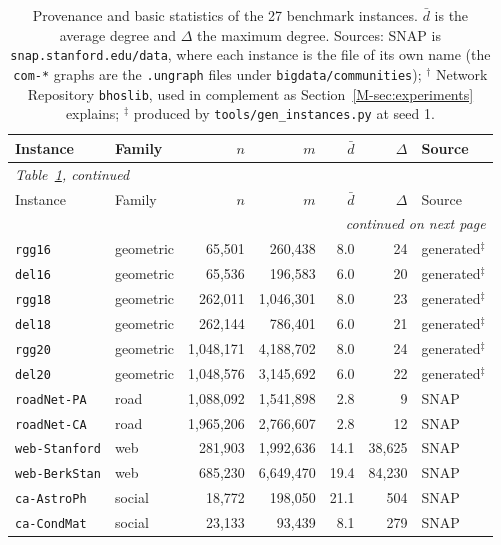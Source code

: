 \footnotesize
\setlength{\tabcolsep}{3pt}
\begin{longtable}{l l r r r r l}
\caption{Provenance and basic statistics of the 27 benchmark instances. $\bar{d}$ is the average degree and $\Delta$ the maximum degree. Sources: SNAP is \texttt{snap.stanford.edu/data}, where each instance is the file of its own name (the \texttt{com-*} graphs are the \texttt{.ungraph} files under \texttt{bigdata/communities}); $^{\dagger}$ Network Repository \texttt{bhoslib}, used in complement as Section~\ref{M-sec:experiments} explains; $^{\ddagger}$ produced by \texttt{tools/gen\_instances.py} at seed 1.}\label{tab:provenance}\\
\toprule
Instance & Family & $n$ & $m$ & $\bar{d}$ & $\Delta$ & Source \\
\midrule
\endfirsthead
\multicolumn{7}{l}{\itshape Table~\ref{tab:provenance}, continued}\\
\toprule
Instance & Family & $n$ & $m$ & $\bar{d}$ & $\Delta$ & Source \\
\midrule
\endhead
\midrule \multicolumn{7}{r}{\itshape continued on next page}\\
\endfoot
\bottomrule
\endlastfoot
\texttt{rgg16} & geometric & 65,501 & 260,438 & 8.0 & 24 & generated$^{\ddagger}$ \\
\texttt{del16} & geometric & 65,536 & 196,583 & 6.0 & 20 & generated$^{\ddagger}$ \\
\texttt{rgg18} & geometric & 262,011 & 1,046,301 & 8.0 & 23 & generated$^{\ddagger}$ \\
\texttt{del18} & geometric & 262,144 & 786,401 & 6.0 & 21 & generated$^{\ddagger}$ \\
\texttt{rgg20} & geometric & 1,048,171 & 4,188,702 & 8.0 & 24 & generated$^{\ddagger}$ \\
\texttt{del20} & geometric & 1,048,576 & 3,145,692 & 6.0 & 22 & generated$^{\ddagger}$ \\
\texttt{roadNet-PA} & road & 1,088,092 & 1,541,898 & 2.8 & 9 & SNAP \\
\texttt{roadNet-CA} & road & 1,965,206 & 2,766,607 & 2.8 & 12 & SNAP \\
\texttt{web-Stanford} & web & 281,903 & 1,992,636 & 14.1 & 38,625 & SNAP \\
\texttt{web-BerkStan} & web & 685,230 & 6,649,470 & 19.4 & 84,230 & SNAP \\
\texttt{ca-AstroPh} & social & 18,772 & 198,050 & 21.1 & 504 & SNAP \\
\texttt{ca-CondMat} & social & 23,133 & 93,439 & 8.1 & 279 & SNAP \\

\end{longtable}

